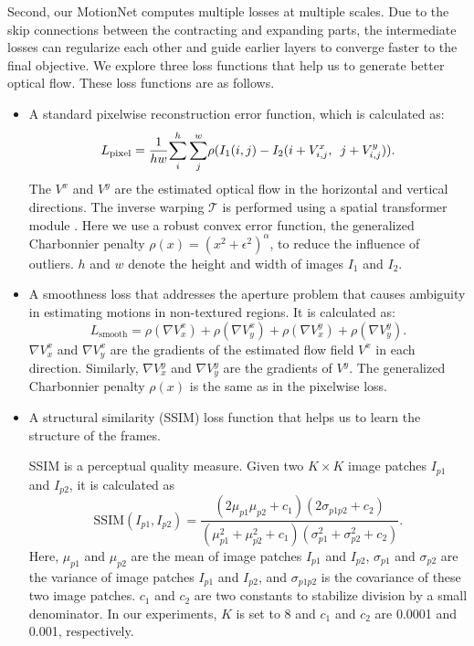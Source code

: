 \documentclass[runningheads]{llncs}
\begin{document}
		Second, our MotionNet computes multiple losses at multiple scales. Due to the skip connections between the contracting and expanding parts, the intermediate losses can regularize each other and guide earlier layers to converge faster to the final objective. We explore three loss functions that help us to generate better optical flow. These loss functions are as follows. 
		\begin{itemize}
			\item A standard pixelwise reconstruction error function, which is calculated as:
			\begin{equation}
				L_{\text{pixel}} = \frac{1}{ h w} {\sum_{i}^{h} \sum_{j}^{w}} \rho ( I_{1}(i, j) - I_{2}(i+V_{i,j}^{x}, \enskip j+V_{i,j}^{y}) ).
				\label{eq:pixel_loss}
			\end{equation}
			The $V^x$ and $V^y$ are the estimated optical flow in the horizontal and vertical directions. The inverse warping $\mathcal{T}$ is performed using a spatial transformer module \cite{stn_nips15}. Here we use a robust convex error function, the generalized Charbonnier penalty $\rho(x) = (x^{2} + \epsilon^{2})^{\alpha}$,  to reduce the influence of outliers. {\color{black} $h$ and $w$ denote the height and width of images $I_{1}$ and $I_{2}$.}
			
			\item A smoothness loss that addresses the aperture problem that causes ambiguity in estimating motions in non-textured regions. It is calculated as:
			\begin{equation}
				L_{\text{smooth}} = \rho (\nabla V_{x}^{x} ) + \rho ( \nabla V_{y}^{x}) + \rho ( \nabla V_{x}^{y}) + \rho ( \nabla V_{y}^{y}) .
				\label{eq:smoothness_loss}
			\end{equation}
			$\nabla V_{x}^{x}$ and $\nabla V_{y}^{x}$ are the gradients of the estimated flow field $V^{x}$ in each direction. Similarly,  $\nabla V_{x}^{y}$ and $\nabla V_{y}^{y}$ are the gradients of $V^{y}$. The generalized Charbonnier penalty $\rho(x)$ is the same as in the pixelwise loss. 
			
			\item A structural similarity (SSIM) loss function{\color{black}\cite{SSIM_2004}} that helps us to learn the structure of the frames. {\color{black} SSIM is a perceptual quality measure. Given two $K \times K$ image patches $I_{p1}$ and $I_{p2}$, it is calculated as 
				\begin{equation}
					\text{SSIM}(I_{p1}, I_{p2}) = \frac{ (2\mu_{p1}\mu_{p2} + c_{1}) (2\sigma_{p1p2} + c_{2}) }{ (\mu_{p1}^{2} + \mu_{p2}^{2} + c_{1}) (\sigma_{p1}^{2} + \sigma_{p2}^{2} + c_{2}) }. 
					\label{eq:ssim_index}
				\end{equation}
				Here, $\mu_{p1}$ and $\mu_{p2}$ are the mean of image patches $I_{p1}$ and $I_{p2}$, $\sigma_{p1}$ and $\sigma_{p2}$ are the variance of image patches $I_{p1}$ and $I_{p2}$, and $\sigma_{p1p2}$ is the covariance of these two image patches. $c_{1}$ and $c_{2}$ are two constants to stabilize division by a small denominator. In our experiments, $K$ is set to $8$ and $c_{1}$ and $c_{2}$ are 0.0001 and 0.001, respectively. 
				
}
\end{itemize}
\end{document}
